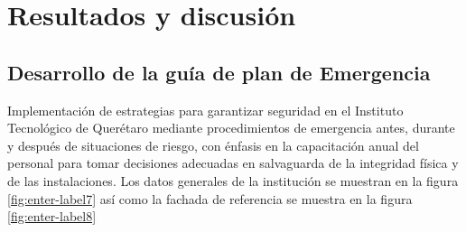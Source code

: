     
    \section{Resultados y discusión}
    
     \subsection{Desarrollo de la guía de plan de Emergencia}
    Implementación de estrategias para garantizar seguridad en el Instituto Tecnológico de Querétaro mediante procedimientos de emergencia antes, durante y después de situaciones de riesgo, con énfasis en la capacitación anual del personal para tomar decisiones adecuadas en salvaguarda de la integridad física y de las instalaciones. Los datos generales de la institución se muestran en la figura \ref{fig:enter-label7} así como la fachada de referencia se muestra en la figura \ref{fig:enter-label8}
